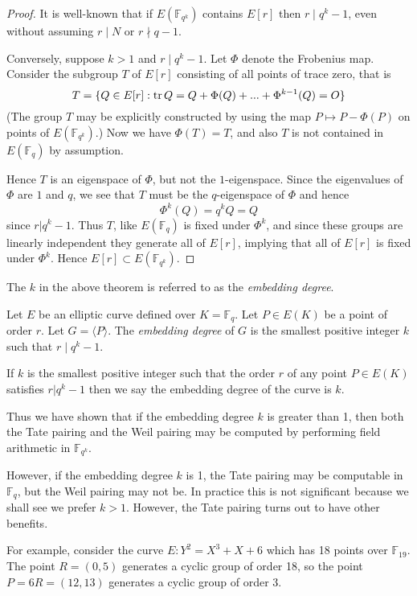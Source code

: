 \begin{proof}
It is well-known that if $E(\mathbb{F}_{q^k})$ contains $E[r]$
then $r \mid q^k - 1$, even without assuming $r \mid N$ or
$r \nmid q-1$.

Conversely, suppose $k > 1$ and $r \mid q^k - 1$.
Let $\Phi$ denote the Frobenius map. Consider the subgroup $T$ of $E[r]$
consisting of all points of trace zero, that is
\[
T = \{ Q \in E[r] : \mathop{\rm tr} Q = Q + \Phi(Q) + ... + \Phi^{k-1}(Q) = O \}
\]
(The group $T$ may be explicitly constructed by using the map $P \mapsto
P - \Phi(P)$ on points of $E(\mathbb{F}_{q^k})$.)
Now we have $\Phi(T) = T$, and also $T$ is not contained
in $E(\mathbb{F}_q)$ by assumption.

Hence $T$ is an eigenspace of $\Phi$, but not the $1$-eigenspace. Since the
eigenvalues of $\Phi$ are $1$ and $q$, we see that $T$ must be the
$q$-eigenspace of $\Phi$ and hence
\[
\Phi^k(Q) = q^k Q = Q
\]
since $r | q^k - 1$. Thus $T$, like $E(\mathbb{F}_q)$ is fixed under
$\Phi^k$, and since these groups are linearly independent they generate all
of $E[r]$, implying that all of $E[r]$ is fixed under $\Phi^k$. Hence
$E[r] \subset E(\mathbb{F}_{q^k})$.
\end{proof}

The $k$ in the above theorem is referred to as the \emph{embedding degree}.

\begin{definition}
Let $E$ be an elliptic curve defined over $K = \mathbb{F}_q$.
Let $P \in E(K)$ be a point of order $r$.
Let $G = \langle P \rangle$.
The \emph{embedding degree} of $G$ is the smallest positive integer $k$
such that $r \mid q^k - 1$.

If $k$ is the smallest positive integer such that
the order $r$ of any point $P \in E(K)$ satisfies $r | q^k - 1$
then we say the embedding degree of the curve is $k$.
\end{definition}

Thus we have shown that if the embedding degree $k$ is greater than 1,
then both the Tate pairing and the Weil pairing may be computed by
performing field arithmetic in $\mathbb{F}_{q^k}$.

However, if the embedding degree $k$ is 1, the Tate pairing may
be computable in $\mathbb{F}_q$, but the Weil pairing may not be.
In practice this is not significant because we shall see we prefer
$k > 1$. However, the Tate pairing turns out to have other benefits.

For example, consider the curve $E: Y^2 = X^3 + X + 6$ which has
18 points over $\mathbb{F}_{19}$.
The point $R=(0,5)$ generates a cyclic group of order 18,
so the point $P = 6R = (12,13)$ generates a cyclic group of order 3.

